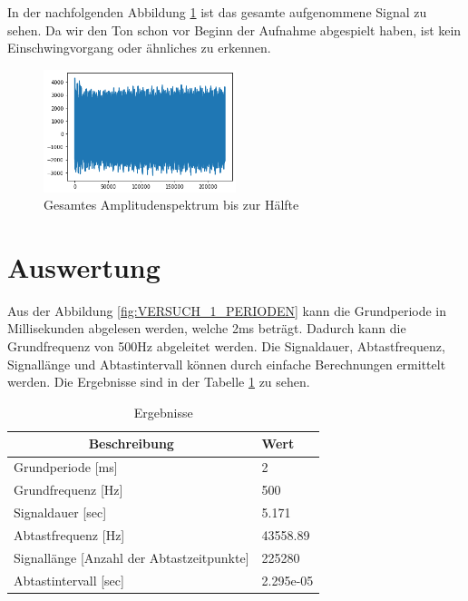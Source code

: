 \documentclass[12pt, oneside, a4paper, \docLanguage]{report}
\begin{document}
In der nachfolgenden Abbildung \ref{fig:VERSUCH_1_DR} ist das gesamte aufgenommene Signal zu sehen. Da wir den Ton schon vor Beginn der Aufnahme abgespielt haben, ist kein Einschwingvorgang oder ähnliches zu erkennen.

\begin{figure}[H]
	\centering\small
	\includegraphics[width=0.5\textwidth]{media/decodedRichtig.png}
	\caption{Gesamtes Amplitudenspektrum bis zur Hälfte}
	\label{fig:VERSUCH_1_DR}
\end{figure}
\newpage
\section{Auswertung}
\label{chap:VERSUCH_1_AUSWERTUNG}
Aus der Abbildung \ref{fig:VERSUCH_1_PERIODEN} kann die Grundperiode in Millisekunden abgelesen werden, welche 2ms beträgt. Dadurch kann die Grundfrequenz von 500Hz abgeleitet werden. Die Signaldauer, Abtastfrequenz, Signallänge und Abtastintervall können durch einfache Berechnungen ermittelt werden. Die Ergebnisse sind in der Tabelle \ref{fig:VERSUCH_1_AUSWERTUNG_TABELLE} zu sehen.

\begin{table}[H]
\center
\begin{tabular}{|l|l|}
\hline
\multicolumn{1}{|c|}{\textbf{Beschreibung}}   & \textbf{Wert} \\ \hline
Grundperiode {[}ms{]}                         & 2          \\ \hline
Grundfrequenz {[}Hz{]}                        & 500        \\ \hline
Signaldauer {[}sec{]}                         & 5.171     \\ \hline
Abtastfrequenz {[}Hz{]}                       & 43558.89   \\ \hline
Signallänge {[}Anzahl der Abtastzeitpunkte{]} & 225280        \\ \hline
Abtastintervall {[}sec{]}                     & 2.295e-05  \\ \hline
\end{tabular}
\caption{Ergebnisse}
\label{fig:VERSUCH_1_AUSWERTUNG_TABELLE}
\end{table}
\end{document}
